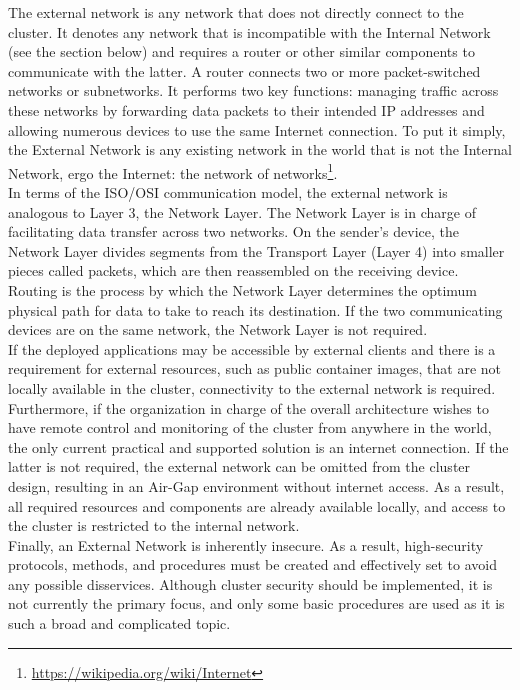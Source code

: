 The external network is any network that does not directly connect to the
cluster. It denotes any network that is incompatible with the Internal Network (see
the section below) and requires a router or other similar components to communicate
with the latter. A router connects two or more packet-switched networks or
subnetworks. It performs two key functions: managing traffic across these
networks by forwarding data packets to their intended IP addresses and allowing
numerous devices to use the same Internet connection\cite{router}. To put it
simply, the External Network is any existing network in the world that is not the
Internal Network, ergo the Internet: the network of networks\footnote{\url{https://wikipedia.org/wiki/Internet}}.
\\ %
In terms of the ISO/OSI communication model, the external network is analogous
to Layer 3, the Network Layer. The Network Layer is in charge of facilitating
data transfer across two networks. On the sender's device, the Network Layer
divides segments from the Transport Layer (Layer 4) into smaller pieces called
packets, which are then reassembled on the receiving device. Routing is the
process by which the Network Layer determines the optimum physical path for data
to take to reach its destination. If the two communicating devices are on the same
network, the Network Layer is not required\cite{osi}. \\ %
If the deployed applications may be accessible by external clients and there is a
requirement for external resources, such as public container images, that are not
locally available in the cluster, connectivity to the external network is
required. Furthermore, if the organization in charge of the overall architecture
wishes to have remote control and monitoring of the cluster from anywhere in the
world, the only current practical and supported solution is an internet connection.
If the latter is not required, the external network can be omitted from the cluster
design, resulting in an Air-Gap environment without internet access. As a result,
all required resources and components are already available locally, and access to
the cluster is restricted to the internal network. \\ %
Finally, an External Network is inherently insecure. As a result, high-security
protocols, methods, and procedures must be created and effectively set to avoid
any possible disservices. Although cluster security should be implemented, it is
not currently the primary focus, and only some basic procedures are used as it is
such a broad and complicated topic.

